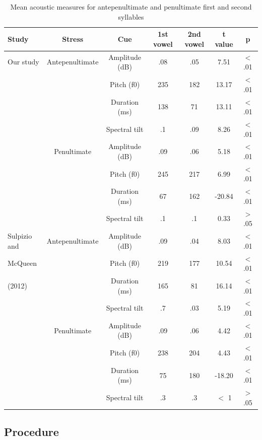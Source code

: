 \begin{table}[ht]
\centering
\caption{Mean acoustic measures for antepenultimate and penultimate first and second syllables}
\begin{tabular*}{\textwidth}{@{\extracolsep{\fill}} lcccccc}
\hline
\textbf{Study} & \textbf{Stress} & \textbf{Cue} & \textbf{1st vowel} & \textbf{2nd vowel} &\textbf{t value} & \textbf{p}\\
\hline
Our study & Antepenultimate & Amplitude (dB)       & .08 & .05 & 7.51  & $<$ .01\\
     &           & Pitch (f0)           & 235 & 182 & 13.17 & $<$ .01\\
     &             & Duration (ms)        & 138 & 71 & 13.11 & $<$ .01\\
     &             & Spectral tilt   & .1 & .09 & 8.26  & $<$ .01 \\
 & Penultimate & Amplitude (dB)      & .09 & .06 & 5.18  & $<$ .01\\
     &             & Pitch (f0)          & 245 & 217 & 6.99  & $<$ .01\\
     &             & Duration (ms)        & 67 & 162 & -20.84 & $<$ .01\\
     &             & Spectral tilt   & .1 & .1 & 0.33  & $>$.05\\
\hline
Sulpizio and &Antepenultimate & Amplitude (dB)    & .09  & .04 & 8.03  & $<$ .01\\
McQueen   &           & Pitch (f0)         & 219 & 177 & 10.54  & $<$ .01\\
 (2012)   &           & Duration (ms)      & 165 & 81  & 16.14  & $<$ .01\\
       &           & Spectral tilt & .7 & .03 & 5.19  & $<$ .01\\
& Penultimate  & Amplitude (dB)     & .09 & .06   & 4.42 & $<$ .01\\
       &           & Pitch (f0)         & 238  & 204 & 4.43 & $<$ .01\\
       &           & Duration (ms)      & 75 & 180   & -18.20 & $<$ .01\\
       &           & Spectral tilt &.3 & .3 & $<$ 1  & $>$.05\\
\hline
\end{tabular*}
\label{tab:acoustics}
\end{table}

\subsection{Procedure}

